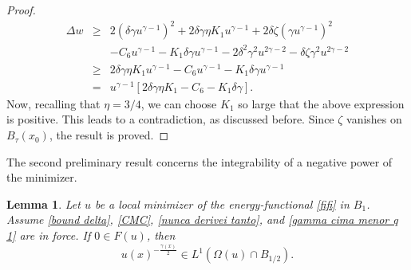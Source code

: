 \documentclass[reqno,11pt]{amsart}
\newtheorem{lemma}{Lemma}[section]
\newcommand{\1}{\mathds{1}}
\numberwithin{equation}{section}
\begin{document}
\begin{proof}
\begin{eqnarray*}
            \Delta w & \geq & 2\left(\delta \gamma u^{\gamma-1}\right)^2 + 2\delta \gamma \eta K_1 u^{\gamma-1} + 2\delta \zeta \left(\gamma u^{\gamma-1}\right)^2\\
            & & - C_6u^{\gamma-1} - K_1 \delta \gamma u^{\gamma-1}- 2\delta^2 \gamma^2 u^{2\gamma-2}  -\delta \zeta \gamma^2 u^{2\gamma-2}\\           
            & \geq &  2\delta \gamma \eta K_1 u^{\gamma-1} - C_6u^{\gamma-1} - K_1\delta \gamma u^{\gamma-1}\\
            & = & u^{\gamma-1} \left[2\delta\gamma \eta K_1 - C_6 - K_1\delta \gamma   \right].
\end{eqnarray*}
Now, recalling that $\eta = 3/4$, we can choose $K_1$ so large that the above expression is positive. This leads to a contradiction, as discussed before. Since $\zeta$ vanishes on $B_\tau(x_0)$, the result is proved.
\end{proof}

The second preliminary result concerns the integrability of a negative power of the minimizer.

\begin{lemma}\label{integrability of negative power of u}
    Let $u$ be a local minimizer of the energy-functional \eqref{fifi} in $B_1$. Assume \eqref{bound delta}, \eqref{CMC}, \eqref{nunca derivei tanto}, and \eqref{gamma cima menor q 1} are in force. If $0 \in F(u)$, then
    $$
        u(x)^{-\frac{\gamma(x)}{2}} \in L^1 (\Omega(u) \cap B_{1/2}).
    $$
\end{lemma}
    
\end{document}
